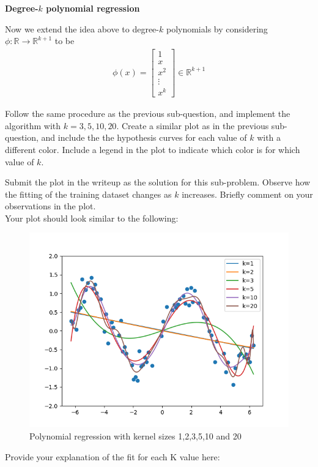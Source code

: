 \item {} {\bf Degree-$k$ polynomial regression}

Now we extend the idea above to degree-$k$ polynomials by considering $\phi:\mathbb{R}\rightarrow \mathbb{R}^{k+1}$ to be 
		\begin{align}
	\phi(x) = \left[\begin{array}{c} 1\\ x \\ x^2\\ \vdots \\x^k \end{array}\right]\in \mathbb{R}^{k+1} \label{eqn:feature-k}
	\end{align}

Follow the same procedure as the previous sub-question, and implement the algorithm with $k=3,5,10,20$. Create a similar plot as in the previous sub-question, and include the the hypothesis curves for each value of $k$ with a different color. Include a legend in the plot to indicate which color is for which value of $k$.


Submit the plot in the writeup as the solution for this sub-problem. Observe how the fitting of the training dataset changes as $k$ increases. Briefly comment on your observations in the plot.\\

Your plot should look similar to the following:
\begin{figure}[H]
  \centering
  \includegraphics[width=0.65\linewidth]{featuremaps/src/large-poly.png}
  \centering
\caption{Polynomial regression with kernel sizes 1,2,3,5,10 and 20}
\end{figure}

Provide your explanation of the fit for each K value here:\\[50pt]
